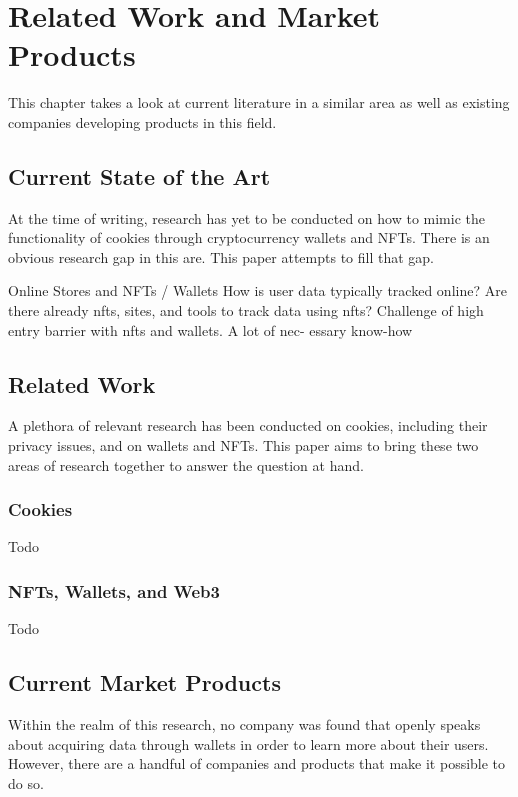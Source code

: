 \chapter{Related Work and Market Products}
\label{ch:SOTA}
This chapter takes a look at current literature in a similar area as well as existing companies developing products in this field.

%
%
\section{Current State of the Art}
\label{sec:sota:stateOfTheArt}
At the time of writing, research has yet to be conducted on how to mimic the functionality of cookies through cryptocurrency wallets and NFTs. There is an obvious research gap in this are. This paper attempts to fill that gap. 

Online Stores and NFTs / Wallets
How is user data typically tracked online? 
Are there already nfts, sites, and tools to track data using nfts? 
Challenge of high entry barrier with nfts and wallets. A lot of nec- essary know-how 


%
%
\section{Related Work}
\label{sec:sota:relatedWork}
A plethora of relevant research has been conducted on cookies, including their privacy issues, and on wallets and NFTs. This paper aims to bring these two areas of research together to answer the question at hand.

\subsection{Cookies}
\label{sec:sota:cookies}
Todo

\subsection{NFTs, Wallets, and Web3}
\label{sec:sota:nfts}
Todo



%
%
\section{Current Market Products}
\label{sec:sota:products}
Within the realm of this research, no company was found that openly speaks about acquiring data through wallets in order to learn more about their users. However, there are a handful of companies and products that make it possible to do so.

